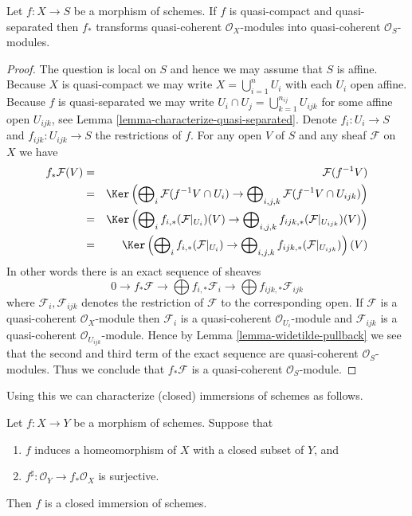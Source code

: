 \begin{lemma}
\label{lemma-push-forward-quasi-coherent}
Let $f : X \to S$ be a morphism of schemes.
If $f$ is quasi-compact and quasi-separated then
$f_*$ transforms quasi-coherent $\mathcal{O}_X$-modules
into quasi-coherent $\mathcal{O}_S$-modules.
\end{lemma}

\begin{proof}
The question is local on $S$ and hence we may assume that
$S$ is affine. Because $X$ is quasi-compact we may write
$X = \bigcup_{i = 1}^n U_i$ with each $U_i$ open affine.
Because $f$ is quasi-separated we may write
$U_i \cap U_j = \bigcup_{k = 1}^{n_{ij}} U_{ijk}$ for some
affine open $U_{ijk}$, see Lemma \ref{lemma-characterize-quasi-separated}.
Denote $f_i : U_i \to S$ and $f_{ijk} : U_{ijk} \to S$ the
restrictions of $f$. For any open $V$ of $S$ and any sheaf
$\mathcal{F}$ on $X$ we have
\begin{eqnarray*}
f_*\mathcal{F}(V) & = & \mathcal{F}(f^{-1}V) \\
& = &
\Ker\left(
\bigoplus\nolimits_i \mathcal{F}(f^{-1}V \cap U_i)
\to
\bigoplus\nolimits_{i, j, k} \mathcal{F}(f^{-1}V \cap U_{ijk})\right) \\
& = &
\Ker\left(
\bigoplus\nolimits_i f_{i, *}(\mathcal{F}|_{U_i})(V)
\to
\bigoplus\nolimits_{i, j, k} f_{ijk, *}(\mathcal{F}|_{U_{ijk}})(V)\right) \\
& = &
\Ker\left(
\bigoplus\nolimits_i f_{i, *}(\mathcal{F}|_{U_i})
\to
\bigoplus\nolimits_{i, j, k} f_{ijk, *}(\mathcal{F}|_{U_{ijk}})\right)(V)
\end{eqnarray*}
In other words there is an exact sequence of sheaves
$$
0 \to f_*\mathcal{F}
\to \bigoplus f_{i, *}\mathcal{F}_i
\to \bigoplus f_{ijk, *}\mathcal{F}_{ijk}
$$
where $\mathcal{F}_i, \mathcal{F}_{ijk}$ denotes the
restriction of $\mathcal{F}$ to the corresponding open.
If $\mathcal{F}$ is a quasi-coherent $\mathcal{O}_X$-module
then $\mathcal{F}_i$ is a quasi-coherent $\mathcal{O}_{U_i}$-module
and $\mathcal{F}_{ijk}$ is a quasi-coherent $\mathcal{O}_{U_{ijk}}$-module.
Hence by Lemma \ref{lemma-widetilde-pullback} we see that the second and
third term of the exact sequence are quasi-coherent
$\mathcal{O}_S$-modules. Thus we conclude that
$f_*\mathcal{F}$ is a quasi-coherent $\mathcal{O}_S$-module.
\end{proof}

\noindent
Using this we can characterize (closed) immersions of schemes
as follows.

\begin{lemma}
\label{lemma-characterize-closed-immersions}
Let $f : X \to Y$ be a morphism of schemes.
Suppose that
\begin{enumerate}
\item $f$ induces a homeomorphism of $X$ with a
closed subset of $Y$, and
\item $f^\sharp : \mathcal{O}_Y \to f_*\mathcal{O}_X$
is surjective.
\end{enumerate}
Then $f$ is a closed immersion of schemes.
\end{lemma}

